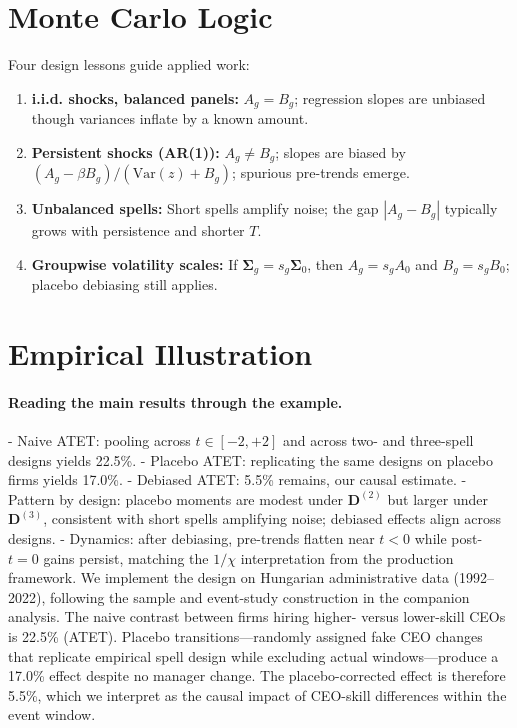\documentclass[11pt,a4paper]{article}
\newcommand{\Var}{\text{Var}}
\begin{document}
\section{Monte Carlo Logic}
Four design lessons guide applied work:
\begin{enumerate}
  \item \textbf{i.i.d. shocks, balanced panels:} $A_g=B_g$; regression slopes are unbiased though variances inflate by a known amount.
  \item \textbf{Persistent shocks (AR(1)):} $A_g\neq B_g$; slopes are biased by $(A_g-\beta B_g)/(\Var(z)+B_g)$; spurious pre-trends emerge.
  \item \textbf{Unbalanced spells:} Short spells amplify noise; the gap $|A_g-B_g|$ typically grows with persistence and shorter $T$.
  \item \textbf{Groupwise volatility scales:} If $\boldsymbol\Sigma_g=s_g\boldsymbol\Sigma_0$, then $A_g=s_gA_0$ and $B_g=s_gB_0$; placebo debiasing still applies.
\end{enumerate}

\section{Empirical Illustration}
\paragraph{Reading the main results through the example.}
- Naive ATET: pooling across $t\in[-2,+2]$ and across two- and three-spell designs yields 22.5\%.
- Placebo ATET: replicating the same designs on placebo firms yields 17.0\%.
- Debiased ATET: 5.5\% remains, our causal estimate.
- Pattern by design: placebo moments are modest under $\mathbf D^{(2)}$ but larger under $\mathbf D^{(3)}$, consistent with short spells amplifying noise; debiased effects align across designs.
- Dynamics: after debiasing, pre-trends flatten near $t<0$ while post-$t=0$ gains persist, matching the $1/\chi$ interpretation from the production framework.
We implement the design on Hungarian administrative data (1992--2022), following the sample and event-study construction in the companion analysis. The naive contrast between firms hiring higher- versus lower-skill CEOs is 22.5\% (ATET). Placebo transitions—randomly assigned fake CEO changes that replicate empirical spell design while excluding actual windows—produce a 17.0\% effect despite no manager change. The placebo-corrected effect is therefore 5.5\%, which we interpret as the causal impact of CEO-skill differences within the event window.
\end{document}
